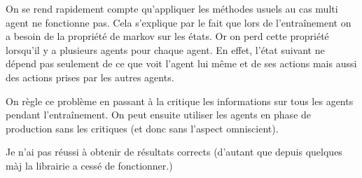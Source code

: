 \documentclass{standalone}
\begin{document}
	On se rend rapidement compte qu'appliquer les méthodes usuels au cas multi agent ne fonctionne pas. Cela s'explique par le fait que lors de l'entraînement on a besoin de la propriété de markov sur les états. Or on perd cette propriété lorsqu'il y a plusieurs agents pour chaque agent. En effet, l'état suivant ne dépend pas seulement de ce que voit l'agent lui même et de ses actions mais aussi des actions prises par les autres agents.
	
	On règle ce problème en passant à la critique les informations sur tous les agents pendant l'entraînement. On peut ensuite utiliser les agents en phase de production sans les critiques (et donc sans l'aspect omniscient).
	
	Je n'ai pas réussi à obtenir de résultats corrects (d'autant que depuis quelques màj la librairie a cessé de fonctionner.)
\end{document}
